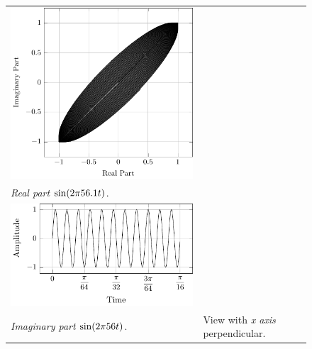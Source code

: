 \documentclass[../../course]{subfiles}
\begin{document}
\begin{figure} [H]
\begin{NiceTabularX} {\textwidth} {
            *{2}{>{\centering\arraybackslash}X}
        }
         {
             {
                \includegraphics[height = \textheight] {tikzpics/plotFrontViewComplexH.pdf}
            }
        }

        \\

         {\emph{Real part} $\sin(2 \pi 56.1 t)$.}
        \label{plt:realCmplxH}

        &
        \\

         {
             {
                \includegraphics[height = \textheight] {tikzpics/plotShortX2.pdf}
            }
        }

        &
        \\

         {\emph{Imaginary part} $\sin(2 \pi 56 t)$.}
        \label{plt:imagCmplxH}

        &

         {View with \emph{x axis} perpendicular.}
        \label{plt:frontViewCmplxH}

        \\

    \end{NiceTabularX}

\end{figure}
\end{document}
